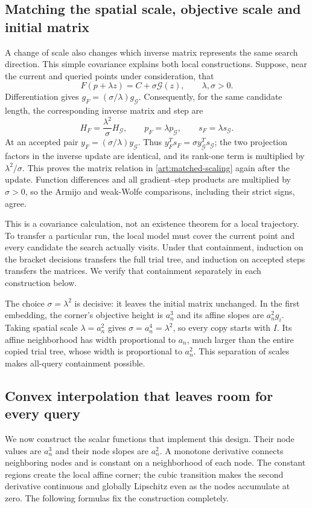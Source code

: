 \subsection{Matching the spatial scale, objective scale and initial matrix}
A change of scale also changes which inverse matrix represents the same
search direction. This simple covariance explains both local constructions.
Suppose, near the current and queried points under consideration, that
\begin{equation}\label{art:matched-local-model}
 F(p+\lambda z)=C+\sigma\mathcal G(z),\qquad \lambda,\sigma>0.
\end{equation}
Differentiation gives $g_F=(\sigma/\lambda)g_{\mathcal G}$. Consequently,
for the same candidate length, the corresponding inverse matrix and step are
\begin{equation}\label{art:matched-scaling}
 H_F=\frac{\lambda^2}{\sigma}H_{\mathcal G},\qquad
 p_F=\lambda p_{\mathcal G},\qquad s_F=\lambda s_{\mathcal G}.
\end{equation}
At an accepted pair $y_F=(\sigma/\lambda)y_{\mathcal G}$. Thus
$y_F^Ts_F=\sigma y_{\mathcal G}^Ts_{\mathcal G}$; the two projection
factors in the inverse update are identical, and its rank-one term is
multiplied by $\lambda^2/\sigma$. This proves the matrix relation in
\eqref{art:matched-scaling} again after the update. Function differences
and all gradient--step products are multiplied by $\sigma>0$, so the
Armijo and weak-Wolfe comparisons, including their strict signs, agree.

This is a covariance calculation, not an existence theorem for a local
trajectory. To transfer a particular run, the local model must cover the
current point and every candidate the search actually visits. Under that
containment, induction on the bracket decisions transfers the full trial
tree, and induction on accepted steps transfers the matrices. We verify
that containment separately in each construction below.

The choice $\sigma=\lambda^2$ is decisive: it leaves the initial matrix
unchanged. In the first embedding, the corner's objective height is $a_n^3$
and its affine slopes are $a_n^2g_i$. Taking spatial scale
$\lambda=a_n^2$ gives $\sigma=a_n^4=\lambda^2$, so every copy starts
with $I$. Its affine neighborhood has width proportional to $a_n$, much
larger than the entire copied trial tree, whose width is proportional to
$a_n^2$. This separation of scales makes all-query containment possible.

\subsection{Convex interpolation that leaves room for every query}
We now construct the scalar functions that implement this design. Their node
values are $a_n^3$ and their node slopes are $a_n^2$. A monotone derivative
connects neighboring nodes and is constant on a neighborhood of each node.
The constant regions create the local affine corner; the cubic transition
makes the second derivative continuous and globally Lipschitz even as the
nodes accumulate at zero. The following formulas fix the construction
completely.

